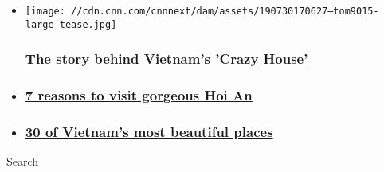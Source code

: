 \begin{itemize}
\item
  \href{/travel/article/crazy-house-dalat-vietnam/index.html}{}

  \texttt{[image: //cdn.cnn.com/cnnnext/dam/assets/190730170627--tom9015-large-tease.jpg]}

  \hypertarget{the-story-behind-vietnams-crazy-house-}{%
  \subsubsection{\texorpdfstring{\href{/travel/article/crazy-house-dalat-vietnam/index.html}{The
  story behind Vietnam's 'Crazy House'
  }}{The story behind Vietnam's 'Crazy House' }}\label{the-story-behind-vietnams-crazy-house-}}
\item
  \hypertarget{7-reasons-to-visit-gorgeous-hoi-an}{%
  \subsubsection{\texorpdfstring{\href{/travel/article/hoi-an-vietnam/index.html}{7
  reasons to visit gorgeous Hoi
  An}}{7 reasons to visit gorgeous Hoi An}}\label{7-reasons-to-visit-gorgeous-hoi-an}}
\item
  \hypertarget{30-of-vietnams-most-beautiful-places}{%
  \subsubsection{\texorpdfstring{\href{/travel/article/vietnam-most-beautiful-places/index.html}{30
  of Vietnam's most beautiful
  places}}{30 of Vietnam's most beautiful places}}\label{30-of-vietnams-most-beautiful-places}}
\end{itemize}

Search

